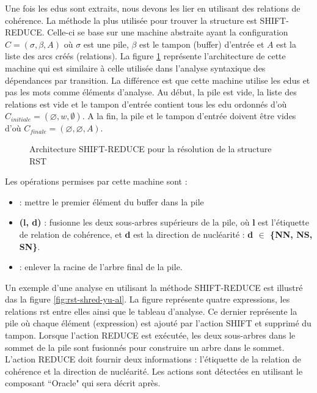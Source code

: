 \documentclass{KodeBook}
\begin{document}
Une fois les \acp{edu} sont extraits, nous devons les lier en utilisant des relations de cohérence. 
La méthode la plus utilisée pour trouver la structure  est SHIFT-REDUCE.  
Celle-ci se base sur une machine abstraite ayant la configuration $C = (\sigma, \beta, A)$ où $\sigma$ est une pile, $\beta$ est le tampon (buffer) d'entrée et $A$ est la liste des arcs créés (relations). 
La figure \ref{fig:rst-shift-reduce} représente l'architecture de cette machine qui est similaire à celle utilisée dans l'analyse syntaxique des dépendances par transition. 
La différence est que cette machine utilise les \acp{edu} et pas les mots comme éléments d'analyse.
Au début, la pile est vide, la liste des relations est vide et le tampon d'entrée contient tous les \ac{edu} ordonnés d'où  $C_{initiale} = (\varnothing, w, \emptyset)$. 
A la fin, la pile et le tampon d'entrée doivent être vides d'où $C_{finale} = (\varnothing, \varnothing, A)$.

\begin{figure}[!ht]
	\centering
	\caption{Architecture SHIFT-REDUCE pour la résolution de la structure RST}
	\label{fig:rst-shift-reduce}
\end{figure}

Les opérations permises par cette machine sont :
\begin{itemize}
	\item {} : mettre le premier élément du buffer dans la pile
	\item {}\textbf{(l, d)} : fusionne les deux sous-arbres supérieurs de la pile, où \textbf{l} est l'étiquette de relation de cohérence, et \textbf{d} est la direction de nucléarité : \textbf{d $ \in $ \{NN, NS, SN\}}.
	\item {} : enlever la racine de l'arbre final de la pile.
\end{itemize}
%
Un exemple d'une analyse  en utilisant la méthode SHIFT-REDUCE est illustré das la figure \ref{fig:rst-shred-yu-al}.
La figure représente quatre expressions, les relations \ac{rst} entre elles ainsi que le tableau d'analyse.
Ce dernier représente la pile où chaque élément (expression) est ajouté par l'action SHIFT et supprimé du tampon.
Lorsque l'action REDUCE est exécutée, les deux sous-arbres dans le sommet de la pile sont fusionnés pour construire un arbre dans le sommet.
L'action REDUCE doit fournir deux informations : l'étiquette de la relation de cohérence et la direction de nucléarité.
Les actions sont détectées en utilisant le composant ``Oracle" qui sera décrit après.
\end{document}
